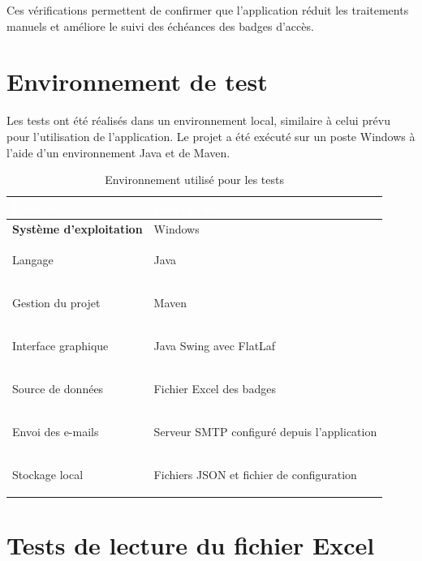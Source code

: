 \documentclass[12pt,a4paper,openany]{report}
\begin{document}
Ces vérifications permettent de confirmer que l'application réduit les traitements
manuels et améliore le suivi des échéances des badges d'accès.

\section{Environnement de test}

Les tests ont été réalisés dans un environnement local, similaire à celui prévu
pour l'utilisation de l'application. Le projet a été exécuté sur un poste Windows
à l'aide d'un environnement Java et de Maven.

\begin{table}[H]
\centering
\small
\renewcommand{\arraystretch}{1.5}
\setlength{\arrayrulewidth}{1pt}

\begin{tabularx}{\textwidth}{|>{\raggedright\arraybackslash\bfseries}p{}|>{\raggedright\arraybackslash}X|}
\hline
\rowcolor{ondaBlue} 
\textcolor{white}{\textbf{Élément}} & \textcolor{white}{\textbf{Description}} \\
\hline

\rowcolor{ondaBlue!5} 
Système d'exploitation & Windows \\
\hline

Langage & Java \\
\hline

\rowcolor{ondaBlue!5} 
Gestion du projet & Maven \\
\hline

Interface graphique & Java Swing avec FlatLaf \\
\hline

\rowcolor{ondaBlue!5} 
Source de données & Fichier Excel des badges \\
\hline

Envoi des e-mails & Serveur SMTP configuré depuis l'application \\
\hline

\rowcolor{ondaBlue!5} 
Stockage local & Fichiers JSON et fichier de configuration \\
\hline

\end{tabularx}
\caption{Environnement utilisé pour les tests}
\label{tab:environnement-tests}
\end{table}

\section{Tests de lecture du fichier Excel}
\end{document}
